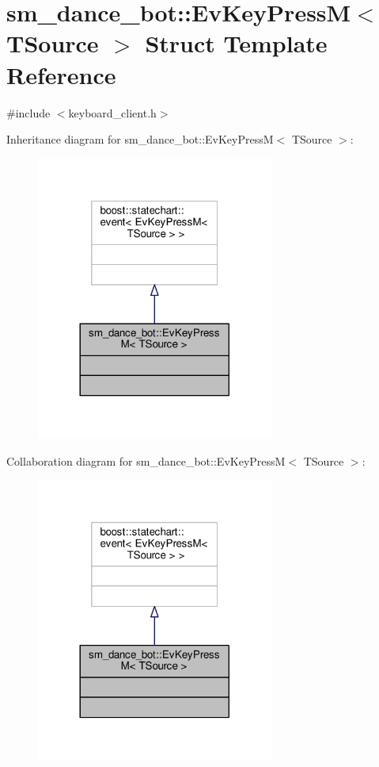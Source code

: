 \hypertarget{structsm__dance__bot_1_1EvKeyPressM}{}\section{sm\+\_\+dance\+\_\+bot\+:\+:Ev\+Key\+PressM$<$ T\+Source $>$ Struct Template Reference}
\label{structsm__dance__bot_1_1EvKeyPressM}


{\ttfamily \#include $<$keyboard\+\_\+client.\+h$>$}



Inheritance diagram for sm\+\_\+dance\+\_\+bot\+:\+:Ev\+Key\+PressM$<$ T\+Source $>$\+:
\nopagebreak
\begin{figure}[H]
\begin{center}
\leavevmode
\includegraphics[width=221pt]{structsm__dance__bot_1_1EvKeyPressM__inherit__graph}
\end{center}
\end{figure}


Collaboration diagram for sm\+\_\+dance\+\_\+bot\+:\+:Ev\+Key\+PressM$<$ T\+Source $>$\+:
\nopagebreak
\begin{figure}[H]
\begin{center}
\leavevmode
\includegraphics[width=221pt]{structsm__dance__bot_1_1EvKeyPressM__coll__graph}
\end{center}
\end{figure}


